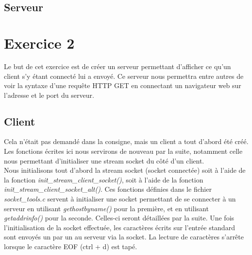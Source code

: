 \documentclass[a4paper, frenchb, 11pt]{article}
\begin{document}

\subsection{Serveur}



\newpage

\section{Exercice 2}
Le but de cet exercice est de créer un serveur permettant d'afficher ce qu'un client s'y étant connecté lui a envoyé. Ce serveur nous permettra entre autres de voir la syntaxe d'une requête HTTP GET en connectant un navigateur web sur l'adresse et le port du serveur.

\subsection{Client}
Cela n'était pas demandé dans la consigne, mais un client a tout d'abord été créé. Les fonctions écrites ici nous servirons de nouveau par la suite, notamment celle nous permettant d'initialiser une stream socket du côté d'un client.\\

Nous initialisons tout d'abord la stream socket (socket connectée) soit à l'aide de la fonction \emph{init\_stream\_client\_socket()}, soit à l'aide de la fonction \emph{init\_stream\_client\_socket\_alt()}. Ces fonctions définies dans le fichier \emph{socket\_tools.c} servent à initialiser une socket permettant de se connecter à un serveur en utilisant \emph{gethostbyname()} pour la première, et en utilisant \emph{getaddrinfo()} pour la seconde. Celles-ci seront détaillées par la suite. Une fois l'initialisation de la socket effectuée, les caractères écrits sur l'entrée standard sont envoyés un par un au serveur via la socket. La lecture de caractères s'arrête lorsque le caractère EOF (ctrl + d) est tapé.
\end{document}
